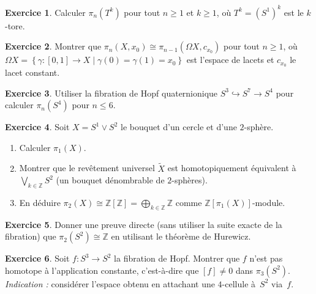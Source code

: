 \documentclass[12pt,a4paper,openany]{book}
\theoremstyle{definition}
\newtheorem{exercice}{Exercice}[chapter]
\theoremstyle{plain}
\theoremstyle{remark}
\newcommand{\Z}{\mathbb{Z}}
\newcommand{\set}[1]{\left\{#1\right\}}
\begin{document}
\begin{exercice}\label{exo:homotopie-2}
  Calculer $\pi_n(T^k)$ pour tout $n \geq 1$ et $k \geq 1$, où $T^k = (S^1)^k$
  est le $k$-tore.
\end{exercice}

\begin{exercice}\label{exo:homotopie-3}
  Montrer que $\pi_n(X, x_0) \cong \pi_{n-1}(\Omega X, c_{x_0})$ pour tout $n \geq 1$,
  où $\Omega X = \set{\gamma \colon [0,1] \to X \mid \gamma(0) = \gamma(1) = x_0}$
  est l'espace de lacets et $c_{x_0}$ le lacet constant.
\end{exercice}

\begin{exercice}\label{exo:homotopie-4}
  Utiliser la fibration de Hopf quaternionique
  $S^3 \hookrightarrow S^7 \to S^4$
  pour calculer $\pi_n(S^4)$ pour $n \leq 6$.
\end{exercice}

\begin{exercice}\label{exo:homotopie-5}
  Soit $X = S^1 \vee S^2$ le bouquet d'un cercle et d'une $2$-sphère.
  \begin{enumerate}[label=(\alph*)]
    \item Calculer $\pi_1(X)$.
    \item Montrer que le revêtement universel $\widetilde{X}$ est homotopiquement
          équivalent à $\bigvee_{k \in \Z} S^2$ (un bouquet dénombrable de $2$-sphères).
    \item En déduire $\pi_2(X) \cong \Z[\Z] = \bigoplus_{k \in \Z} \Z$ comme
          $\Z[\pi_1(X)]$-module.
  \end{enumerate}
\end{exercice}

\begin{exercice}\label{exo:homotopie-6}
  Donner une preuve directe (sans utiliser la suite exacte de la fibration) que
  $\pi_2(S^2) \cong \Z$ en utilisant le théorème de Hurewicz.
\end{exercice}

\begin{exercice}\label{exo:homotopie-7}
  Soit $f \colon S^3 \to S^2$ la fibration de Hopf. Montrer que $f$ n'est pas
  homotope à l'application constante, c'est-à-dire que $[f] \neq 0$ dans
  $\pi_3(S^2)$.
  \emph{Indication :} considérer l'espace obtenu en attachant une $4$-cellule
  à~$S^2$ via~$f$.
\end{exercice}
\end{document}

